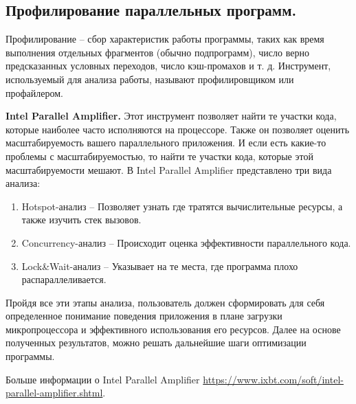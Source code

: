 \subsection{Профилирование параллельных программ.}

Профилирование -- сбор характеристик работы программы, таких как время выполнения отдельных фрагментов (обычно подпрограмм), число верно предсказанных условных переходов, число кэш-промахов и т. д. Инструмент, используемый для анализа работы, называют профилировщиком или профайлером.

\textbf{Intel Parallel Amplifier.} Этот инструмент позволяет найти те участки кода, которые наиболее часто исполняются на процессоре. Также он позволяет оценить масштабируемость вашего параллельного приложения. И если есть какие-то проблемы с масштабируемостью, то найти те участки кода, которые этой масштабируемости мешают. В Intel Parallel Amplifier представлено три вида анализа:

\begin{enumerate}
    \item Hotspot-анализ -- Позволяет узнать где тратятся вычислительные ресурсы, а также изучить стек вызовов.
    \item Concurrency-анализ -- Происходит оценка эффективности параллельного кода.
    \item Lock\&Wait-анализ -- Указывает на те места, где программа плохо распараллеливается.
\end{enumerate}

Пройдя все эти этапы анализа, пользователь должен сформировать для себя определенное понимание поведения приложения в плане загрузки микропроцессора и эффективного использования его ресурсов. Далее на основе полученных результатов, можно решать дальнейшие шаги оптимизации программы.

Больше информации о Intel Parallel Amplifier \url{https://www.ixbt.com/soft/intel-parallel-amplifier.shtml}.
